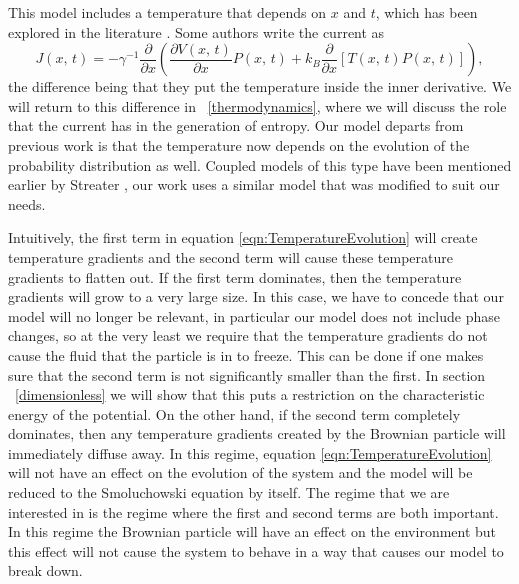 This model includes a temperature that depends on $x$ and $t$, which has been explored in the literature \cite{Kramers1940}. Some authors write the current as \cite{Kramers1940,Kampen1988}
\begin{equation}
J(x, \, t) = -\gamma^{-1} \frac{\partial}{\partial x} \left (\frac{\partial V(x, \, t)}{\partial x} P(x, \, t) + k_B \frac{\partial}{\partial x}[T(x, \, t) P(x, \, t)] \right ),  \label{eqn:diffCurrent}
\end{equation}
the difference being that they put the temperature inside the inner derivative. We will return to this difference in ~\autoref{thermodynamics}, where we will discuss the role that the current has in the generation of entropy.
Our model departs from previous work is that the temperature now depends on the evolution of the probability distribution as well. Coupled models of this type have been mentioned earlier by Streater \cite{Streater1997, Streater1997a,Streater2000,Streater1997b}, our work uses a similar model that was modified to suit our needs.

Intuitively, the first term in equation \ref{eqn:TemperatureEvolution} will create temperature gradients and the second term will cause these temperature gradients to flatten out. If the first term dominates, then the temperature gradients will grow to a very large size. In this case, we have to concede that our model will no longer be relevant, in particular our model does not include phase changes, so at the very least we require that the temperature gradients do not cause the fluid that the particle is in to freeze. This can be done if one makes sure that the second term is not significantly smaller than the first. In section ~\autoref{dimensionless} we will show that this puts a restriction on the characteristic energy of the potential. On the other hand, if the second term completely dominates, then any temperature gradients created by the Brownian particle will immediately diffuse away. In this regime, equation \ref{eqn:TemperatureEvolution} will not have an effect on the evolution of the system and the model will be reduced to the Smoluchowski equation by itself. The regime that we are interested in is the regime where the first and second terms are both important. In this regime the Brownian particle will have an effect on the environment but this effect will not cause the system to behave in a way that causes our model to break down. 

